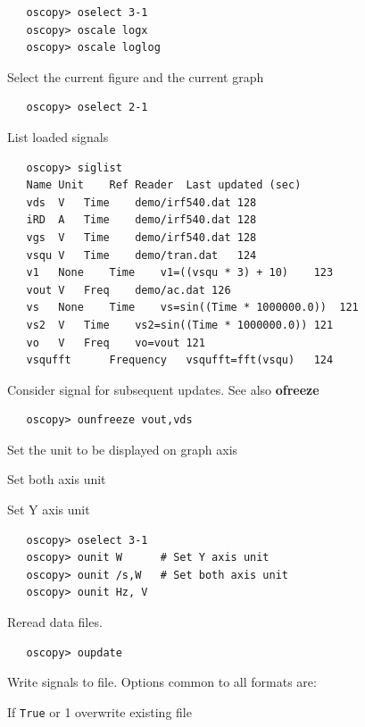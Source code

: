 \documentclass[a4paper,11pt]{report}
\renewenvironment{description}{%
\begin{basedescript}{%
\renewcommand{\makelabel}[1]{\bfseries##1}%
}%
}{%
\end{basedescript}%
}
\begin{document}
\begin{lstlisting}
   oscopy> oselect 3-1
   oscopy> oscale logx
   oscopy> oscale loglog
\end{lstlisting}

   Select the current figure and the current graph
\begin{lstlisting}
   oscopy> oselect 2-1
\end{lstlisting}

   List loaded signals
\begin{lstlisting}
   oscopy> siglist
   Name	Unit	Ref	Reader	Last updated (sec)
   vds	V	Time	demo/irf540.dat	128
   iRD	A	Time	demo/irf540.dat	128
   vgs	V	Time	demo/irf540.dat	128
   vsqu	V	Time	demo/tran.dat	124
   v1	None	Time	v1=((vsqu * 3) + 10)	123
   vout	V	Freq	demo/ac.dat	126
   vs	None	Time	vs=sin((Time * 1000000.0))	121
   vs2	V	Time	vs2=sin((Time * 1000000.0))	121
   vo	V	Freq	vo=vout	121
   vsqufft		Frequency	vsqufft=fft(vsqu)	124
\end{lstlisting}

   Consider signal for subsequent updates. See also \textbf{ofreeze}
\begin{lstlisting}
   oscopy> ounfreeze vout,vds
\end{lstlisting}

   Set the unit to be displayed on graph axis
   \begin{description}
   \item[ounit XUNIT, YUNIT] Set both axis unit
   \item[ounit YUNIT] Set Y axis unit
   \end{description}

\begin{lstlisting}
   oscopy> oselect 3-1
   oscopy> ounit W      # Set Y axis unit
   oscopy> ounit /s,W   # Set both axis unit
   oscopy> ounit Hz, V
\end{lstlisting}

   Reread data files.

\begin{lstlisting}
   oscopy> oupdate
\end{lstlisting}

   Write signals to file.
Options common to all formats are:
\begin{description}
\item[ow] If \texttt{True} or 1 overwrite existing file
\end{description}
\end{document}
